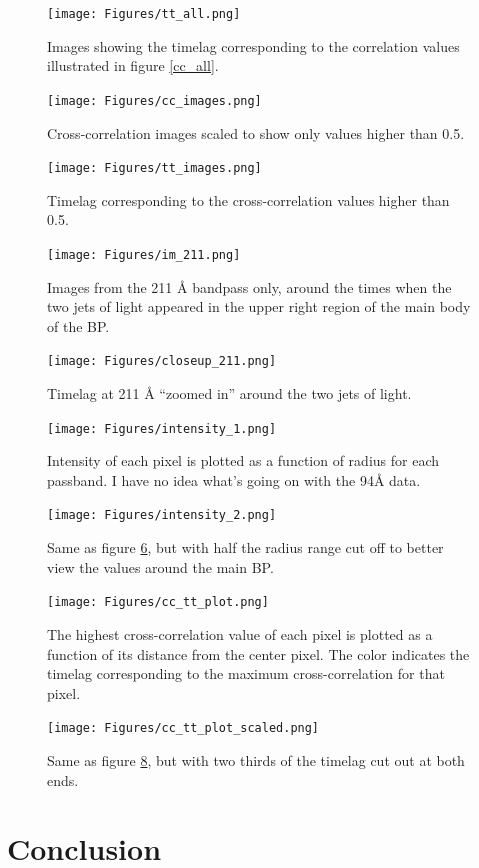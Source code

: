 \documentclass[preprint2]{aastex}
\begin{document}
\begin{figure}[htb!]
    \texttt{[image: Figures/tt\_all.png]}
    \caption{Images showing the timelag corresponding to the correlation values
        illustrated in figure \ref{cc_all}.}
    \label{tt_all}
\end{figure}

\begin{figure}[htb!]
    \texttt{[image: Figures/cc\_images.png]}
    \caption{Cross-correlation images scaled to show only values higher than 0.5.}
    \label{cc}
\end{figure}

\begin{figure}[htb!]
    \texttt{[image: Figures/tt\_images.png]}
    \caption{Timelag corresponding to the cross-correlation values higher than 0.5.}
    \label{tt}
\end{figure}

\begin{figure}[htb!]
    \texttt{[image: Figures/im\_211.png]}
    \caption{Images from the 211 \AA{} bandpass only, around the times when the
        two jets of light appeared in the upper right region of the main body of the BP. }
    \label{tt}
\end{figure}

\begin{figure}[htb!]
    \texttt{[image: Figures/closeup\_211.png]}
    \caption{Timelag at 211 \AA{} ``zoomed in'' around the two jets of light.}
    \label{closeup}
\end{figure}

\begin{figure}[htb!]
    \texttt{[image: Figures/intensity\_1.png]}
    \caption{Intensity of each pixel is plotted as a function of radius for each
        passband. I have no idea what's going on with the 94\AA{} data.}
    \label{intensity_1}
\end{figure}

\begin{figure}[htb!]
    \texttt{[image: Figures/intensity\_2.png]}
    \caption{Same as figure \ref{intensity_1}, but with half the radius range
        cut off to better view the values around the main BP.}
    \label{intensity_2}
\end{figure}

\begin{figure}[htb!]
    \texttt{[image: Figures/cc\_tt\_plot.png]}
    \caption{The highest cross-correlation value of each pixel is plotted as a function
        of its distance from the center pixel. The color indicates the timelag
        corresponding to the maximum cross-correlation for that pixel.}
    \label{tt_all_plot}
\end{figure}

\begin{figure}[htb!]
    \texttt{[image: Figures/cc\_tt\_plot\_scaled.png]}
    \caption{Same as figure \ref{tt_all_plot}, but with two thirds of the timelag cut out
        at both ends.}
    \label{tt_plot}
\end{figure}


\section{Conclusion}\label{conclusion}


\end{document}
